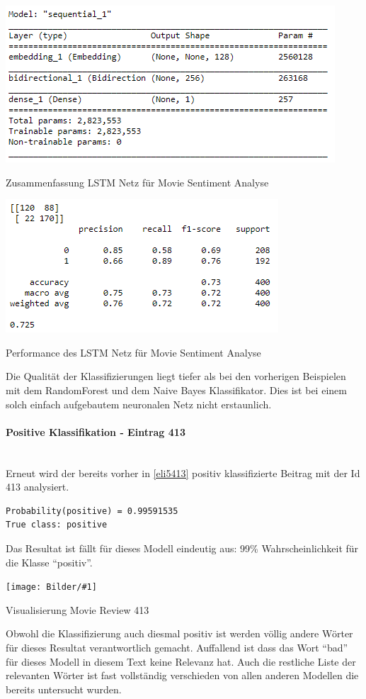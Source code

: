 \documentclass[
  12pt, %
  a4paper, %
  oneside, %
  openany, 
  numbers=noenddot, %
  BCOR=5mm, %
  parskip=half*, %
  thesis, %
]{bfhbook}
\newcommand{\parag}[1]{\paragraph*{#1}\mbox{}\\}
\newcommand{\imgText}[3]{
\begin{center}
    \begin{minipage}[t]{0.6\textwidth}
    		\vspace{0pt}
		\texttt{[image: Bilder/\#1]}
		\caption{#2}
	\end{minipage}\hfill
    \begin{minipage}[t]{0.4\textwidth}
    		\vspace{5pt}
  		#3
    \end{minipage}
\end{center}
}
\begin{document}
\begin{center}
    \begin{minipage}[t]{0.45\textwidth}
    		\vspace{0pt}
		\includegraphics[width=\textwidth, left]{Bilder/MovieReview-LSTM-Summary.PNG}
		\caption{Zusammenfassung LSTM Netz für Movie Sentiment Analyse}
	\end{minipage}\hfill
    \begin{minipage}[t]{0.45\textwidth}
    		\vspace{0pt}
  		\includegraphics[width=\textwidth, left]{Bilder/MovieReview-LSTM-Accuracy.PNG}
		\caption{Performance des LSTM Netz für Movie Sentiment Analyse}
    \end{minipage}
\end{center}
Die Qualität der Klassifizierungen liegt tiefer als bei den vorherigen Beispielen mit dem RandomForest und dem Naive Bayes Klassifikator. Dies ist bei einem solch einfach aufgebautem neuronalen Netz nicht erstaunlich.
\parag{Positive Klassifikation - Eintrag 413}
Erneut wird der bereits vorher in \ref{eli5413} positiv klassifizierte Beitrag mit der Id 413 analysiert.
\begin{lstlisting}
Probability(positive) = 0.99591535
True class: positive
\end{lstlisting}
Das Resultat ist fällt für dieses Modell eindeutig aus: 99\% Wahrscheinlichkeit für die Klasse ``positiv''.
\imgText{MovieReview-LSTM-Display-413.PNG}{Visualisierung Movie Review 413}{
Obwohl die Klassifizierung auch diesmal positiv ist werden völlig andere Wörter für dieses Resultat verantwortlich gemacht.
Auffallend ist dass das Wort ``bad'' für dieses Modell in diesem Text keine Relevanz hat. Auch die restliche Liste der relevanten Wörter ist fast vollständig verschieden von allen anderen Modellen die bereits untersucht wurden.
}
\end{document}
